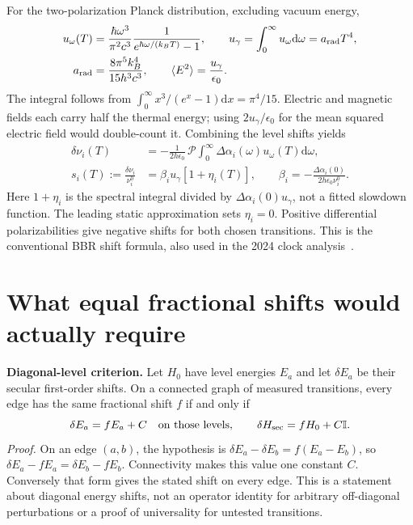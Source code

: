 \documentclass[11pt,a4paper]{article}
\newcommand{\id}{\mathbb I}
\newcommand{\dd}{\mathrm d}
\begin{document}
For the two-polarization Planck distribution, excluding vacuum energy,
\begin{align}
 u_\omega(T)&=\frac{\hbar\omega^3}{\pi^2c^3}
       \frac{1}{e^{\hbar\omega/(k_BT)}-1},\qquad
 u_\gamma=\int_0^\infty u_\omega\dd\omega=a_{\rm rad}T^4,\\
 a_{\rm rad}&=\frac{8\pi^5k_B^4}{15h^3c^3},\qquad
 \langle E^2\rangle=\frac{u_\gamma}{\epsilon_0}.\label{eq:planck}
\end{align}
The integral follows from $\int_0^\infty x^3/(e^x-1)\dd x=\pi^4/15$.
Electric and magnetic fields each carry half the thermal energy;
using $2u_\gamma/\epsilon_0$ for the mean squared electric field would
double-count it. Combining the level shifts yields
\begin{align}
 \delta\nu_i(T)&=-\frac{1}{2h\epsilon_0}\,\mathcal P
       \int_0^\infty\Delta\alpha_i(\omega)u_\omega(T)\dd\omega,
       \label{eq:full}\\
 s_i(T):=\frac{\delta\nu_i}{\nu_i^0}
       &=\beta_i u_\gamma[1+\eta_i(T)],\qquad
 \beta_i=-\frac{\Delta\alpha_i(0)}{2h\epsilon_0\nu_i^0}.\label{eq:beta}
\end{align}
Here $1+\eta_i$ is the spectral integral divided by
$\Delta\alpha_i(0)u_\gamma$, not a fitted slowdown function.
The leading static approximation sets $\eta_i=0$. Positive differential
polarizabilities give negative shifts for both chosen transitions.
This is the conventional BBR shift formula, also used in the 2024
clock analysis~\cite{tofful}.

\newpage
\section{What equal fractional shifts would actually require}
\textbf{Diagonal-level criterion.} Let $H_0$ have level energies $E_a$
and let $\delta E_a$ be their secular first-order shifts. On a connected
graph of measured transitions, every edge has the same fractional
shift $f$ if and only if
\begin{equation}\label{eq:lemma}
 \delta E_a=fE_a+C\quad\hbox{on those levels},\qquad
 \delta H_{\rm sec}=fH_0+C\id .
\end{equation}
\emph{Proof.} On an edge $(a,b)$, the hypothesis is
$\delta E_a-\delta E_b=f(E_a-E_b)$, so
$\delta E_a-fE_a=\delta E_b-fE_b$. Connectivity makes this value one
constant $C$. Conversely that form gives the stated shift on every
edge. This is a statement about diagonal energy shifts, not an
operator identity for arbitrary off-diagonal perturbations or a proof
of universality for untested transitions.
\end{document}
